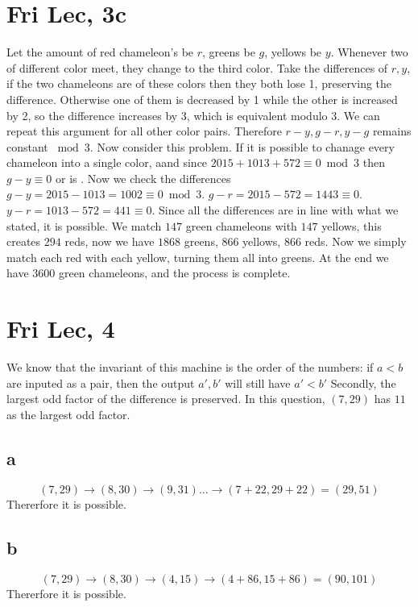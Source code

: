 \documentclass[12pt]{article}
\begin{document}
\section{Fri Lec, 3c}
Let the amount of red chameleon's be $r$, greens be $g$, yellows be $y$. Whenever two of different color meet, they change to the third color. Take the differences of $r,y$, if the two chameleons are of these colors then they both lose 1, preserving the difference. Otherwise one of them is decreased by 1 while the other is increased by 2, so the difference increases by 3, which is equivalent modulo 3.
\newline
We can repeat this argument for all other color pairs. Therefore $r-y, g-r, y-g$ remains constant $\bmod 3$.
\newline
Now consider this problem. If it is possible to chanage every chameleon into a single color, aand since $2015+1013+572 \equiv 0 \bmod 3$ then $g-y \equiv 0$ or is . Now we check the differences $g-y = 2015-1013 = 1002 \equiv 0 \bmod 3$. $g-r = 2015-572=1443 \equiv 0$. $y-r = 1013-572=441\equiv 0$. Since all the differences are in line with what we stated, it is possible.
\newline
We match $147$ green chameleons with $147$ yellows, this creates $294$ reds, now we have $1868$ greens, $866$ yellows, $866$ reds. Now we simply match each red with each yellow, turning them all into greens. At the end we have $3600$ green chameleons, and the process is complete.


\section{Fri Lec, 4}
We know that the invariant of this machine is the order of the numbers: if $a<b$ are inputed as a pair, then the output $a',b'$ will still have $a'<b'$
\newline
Secondly, the largest odd factor of the difference is preserved. In this question, $(7,29)$ has $11$ as the largest odd factor.

\subsection{a}
$$(7,29) \to (8,30) \to (9, 31) ... \to (7+22, 29+22) = (29, 51)$$
Thererfore it is possible.

\subsection{b}
$$(7,29) \to (8,30) \to (4, 15) \to (4+86, 15+86) = (90, 101)$$
Thererfore it is possible.
\end{document}
